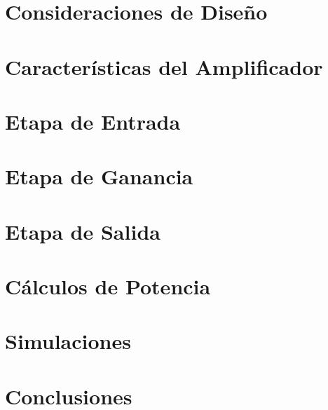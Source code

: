 







\tableofcontents
\newpage


\section{Consideraciones de Diseño}
	\label{consideraciones}
%		

\section{Características del Amplificador}
	\label{caracteristicas}
%	

\section{Etapa de Entrada}
	\label{inputstage}
	
		
\section{Etapa de Ganancia}
	\label{gainstage}
%	
	
\section{Etapa de Salida}
	\label{outputstage}
%	

\section{Cálculos de Potencia}
	\label{calculospotencia}
%		
	
\section{Simulaciones}
	\label{simulaciones}
%	

\section{Conclusiones}
	\label{simulaciones}
	
